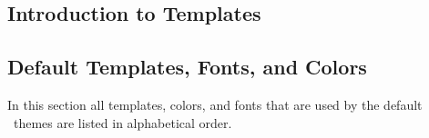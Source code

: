 














\subsection{Introduction to Templates}



\subsection{Default Templates, Fonts, and Colors}

\label{section-color-listing}

In this section all templates, colors, and fonts that are used by the
default \beamer\ themes are listed in alphabetical order. 

